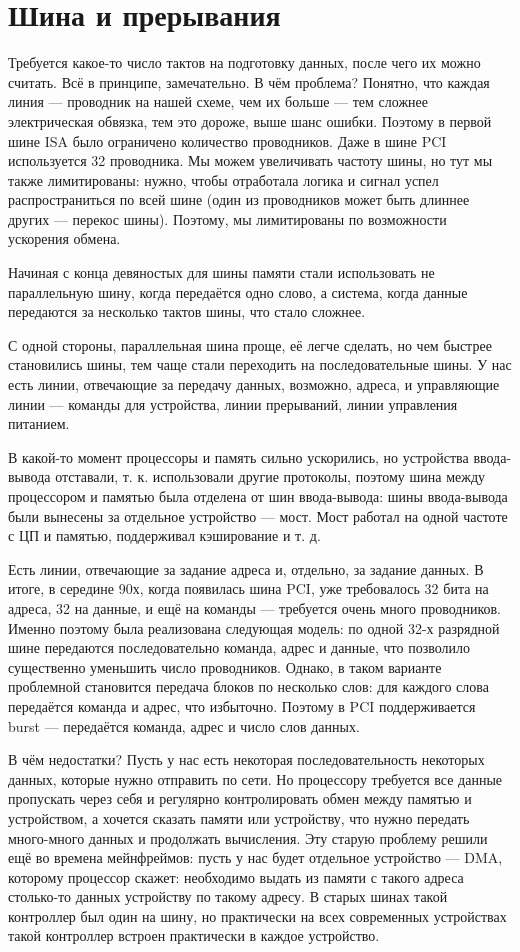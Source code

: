 \documentclass[main.tex]{subfiles}
\begin{document}
\section{Шина и прерывания}
Требуется какое-то число тактов на подготовку данных, после чего их можно считать.
Всё в принципе, замечательно. В чём проблема?
Понятно, что каждая линия --- проводник на нашей схеме, чем их больше ---
тем сложнее электрическая обвязка, тем это дороже, выше шанс ошибки.
Поэтому в первой шине ISA
было ограничено количество проводников. Даже в шине PCI используется 32 проводника.
Мы можем увеличивать частоту шины, но тут мы также лимитированы: нужно, чтобы
отработала логика и сигнал успел распространиться по всей шине
(один из проводников может быть длиннее других --- перекос шины).
Поэтому, мы лимитированы по возможности ускорения обмена.

Начиная с конца девяностых для шины памяти стали использовать не параллельную
шину, когда передаётся одно слово, а система, когда данные передаются за несколько
тактов шины, что стало сложнее.

С одной стороны, параллельная шина проще, её легче сделать, но чем быстрее
становились шины, тем чаще стали переходить на последовательные шины.
У нас есть линии, отвечающие за передачу данных, возможно, адреса, и управляющие
линии --- команды для устройства, линии прерываний, линии управления питанием.

В какой-то момент процессоры и память сильно ускорились, но устройства ввода-вывода
отставали, т. к. использовали другие протоколы, поэтому шина между процессором
и памятью была отделена от шин ввода-вывода: шины ввода-вывода были вынесены за
отдельное устройство --- мост. Мост работал на одной частоте с ЦП и памятью,
поддерживал кэширование и т. д.

Есть линии, отвечающие за задание адреса и, отдельно, за задание данных.
В итоге, в середине 90х, когда появилась шина PCI, уже требовалось
32 бита на адреса, 32 на данные, и ещё на команды --- требуется очень много
проводников. Именно поэтому была реализована следующая модель:
по одной 32-х разрядной шине передаются последовательно команда, адрес
и данные, что позволило существенно уменьшить число проводников.
Однако, в таком варианте проблемной становится передача блоков по
несколько слов: для каждого слова передаётся команда и адрес,
что избыточно. Поэтому в PCI поддерживается burst --- передаётся
команда, адрес и число слов данных.

В чём недостатки? Пусть у нас есть некоторая последовательность некоторых данных,
которые нужно отправить по сети. Но процессору требуется все данные пропускать
через себя и регулярно контролировать обмен между памятью и устройством, а
хочется сказать памяти или устройству, что нужно передать много-много данных
и продолжать вычисления. Эту старую проблему решили ещё во времена мейнфреймов:
пусть у нас будет отдельное устройство --- DMA, которому процессор скажет:
необходимо выдать из памяти с такого адреса столько-то данных устройству по
такому адресу. В старых шинах такой контроллер был один на шину, но практически
на всех современных устройствах такой контроллер встроен практически в каждое
устройство.
\end{document}
